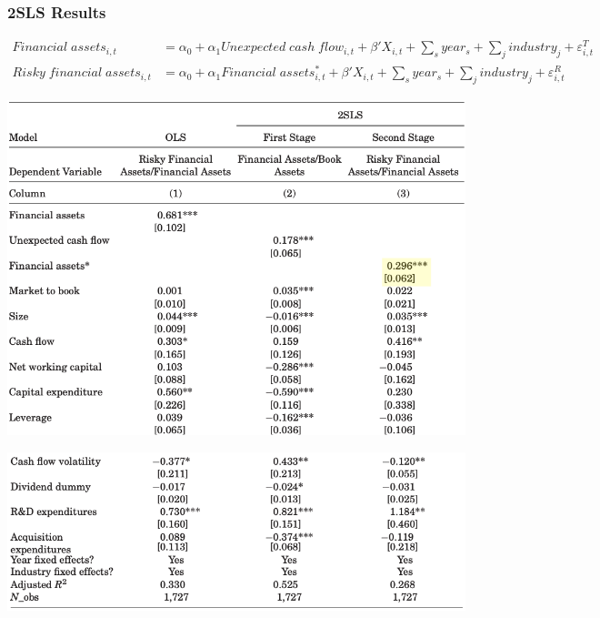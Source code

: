 \documentclass[handout]{beamer}
\begin{document}
\begin{frame}
\frametitle{2SLS Results}

\tiny

\begin{align*}
Financial \; assets_{i,t} &= \alpha_0 + \alpha_1 Unexpected \; cash \; flow_{i,t} + \beta' X_{i,t} + \sum_s year_s + \sum_j industry_j + \varepsilon_{i,t}^T\\
Risky \; financial \; assets_{i,t} &= \alpha_0 + \alpha_1 Financial \; assets_{i,t}^* + \beta' X_{i,t} + \sum_s year_s + \sum_j industry_j + \varepsilon_{i,t}^R
\end{align*}

\centering
\includegraphics[scale=0.20]{regression_1_2sls}

\includegraphics[scale=0.20]{regression_2_2sls}

\end{frame}
\end{document}
